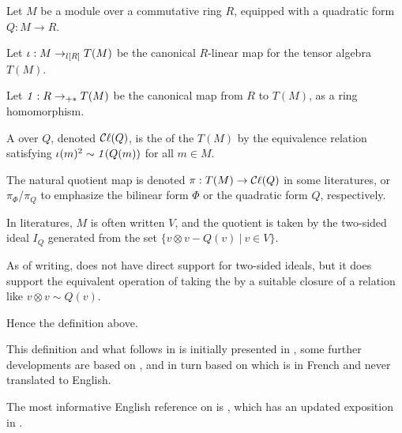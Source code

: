 Let $M$ be a module over a commutative ring $R$, equipped with a quadratic form $Q: M \to R$.

\begin{definition}
    \label{CliffordAlgebra}
    \leanok

    Let $\iota : M \to_{l[R]} T(M)$ be the canonical $R$-linear map for the tensor algebra $T(M)$.

    Let $\mathit{1} : R \to_{+*} T(M)$ be the canonical map from $R$ to $T(M)$, as a ring homomorphism.

    A  over $Q$, denoted $\mathop{\mathcal{C}\ell} (Q)$, is
    the  of the  $T(M)$
    by the equivalence relation satisfying $\iota(m)^2 \sim \mathit{1}(Q(m))$ for all $m \in M$.

    The natural quotient map is denoted $\pi : T(M) \to \mathop{\mathcal{C}\ell} (Q)$ in some literatures,
    or $\pi_\Phi$/$\pi_Q$ to emphasize the bilinear form $\Phi$ or the quadratic form $Q$, respectively.

\end{definition}

\begin{remark}
  \label{mk:two_sided_ideals}
  
  In literatures, $M$ is often written $V$, and the quotient is taken by the two-sided ideal $I_Q$ generated from the set
  $\{ v \otimes v - Q(v) \:\vert\: v \in V \}$.

  As of writing, \Mathlib does not have direct support for two-sided ideals,
  but it does support the equivalent operation of taking the  by a suitable closure of
  a relation like $v \otimes v \sim Q(v)$.

  Hence the definition above.

\end{remark}

\begin{remark}
  \label{mk:CliffordAlgebra}
  
  This definition and what follows in \Mathlib is initially presented in \cite{wieser2022formalizing},
  some further developments are based on \cite{grinberg2016clifford}, and in turn based on \cite{bourbaki2007}
  which is in French and never translated to English.

  The most informative English reference on \cite{bourbaki2007} is \cite{jadczyk2019notes}, 
  which has an updated exposition in \cite{jadczyk2023bundle}.

\end{remark}


